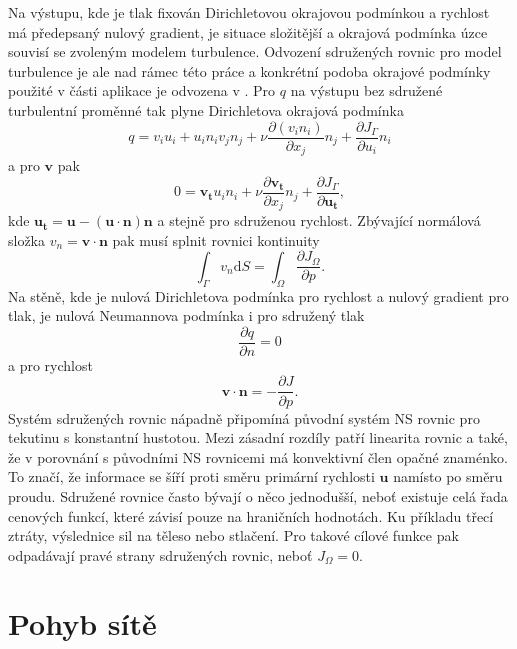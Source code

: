 Na výstupu, kde je tlak fixován Dirichletovou okrajovou podmínkou a rychlost má předepsaný nulový gradient, je situace složitější a okrajová podmínka úzce souvisí se zvoleným modelem turbulence. Odvození sdružených rovnic pro model turbulence je ale nad rámec této práce a konkrétní podoba okrajové podmínky použité v části aplikace je odvozena v \cite{zymaris2009continuous}. Pro $ q $ na výstupu bez sdružené turbulentní proměnné tak plyne Dirichletova okrajová podmínka
\begin{equation}
q = v_i u_i + u_i n_i v_j n_j + \nu \frac{\partial (v_in_i)}{\partial x_j}n_j+\frac{\partial J_\Gamma}{\partial u_i} n_i
\end{equation}
a pro $ \mathbf{v} $ pak
\begin{equation}
0=\mathbf{v_t}u_in_i+\nu\frac{\partial \mathbf{v_t}}{\partial x_j}n_j + \frac{\partial J_\Gamma}{\partial \mathbf{u_t}},
\end{equation}
kde $ \mathbf{u_t}=\mathbf{u}-(\mathbf{u\cdot n})\mathbf{n} $ a stejně pro sdruženou rychlost. Zbývající normálová složka $ v_n=\mathbf{v}\cdot\mathbf{n} $ pak musí splnit rovnici kontinuity
\begin{equation}
\int_{\Gamma}v_n\mathrm{d}S=\int_{\Omega}\frac{\partial J_\Omega}{\partial p}.
\end{equation}
Na stěně, kde je nulová Dirichletova podmínka pro rychlost a nulový gradient pro tlak, je nulová Neumannova podmínka i pro sdružený tlak
\begin{equation}
\frac{\partial q}{\partial n}=0
\end{equation} 
a pro rychlost
\begin{equation}
\mathbf{v} \cdot \mathbf{n}=-\dfrac{\partial J}{\partial p}.
\end{equation}
Systém sdružených rovnic nápadně připomíná původní systém NS rovnic pro tekutinu s konstantní hustotou. Mezi zásadní rozdíly patří linearita rovnic a také, že v porovnání s původními NS rovnicemi má konvektivní člen opačné znaménko. To značí, že informace se šíří proti směru primární rychlosti $ \mathbf{u} $ namísto po směru proudu. Sdružené rovnice často bývají o něco jednodušší, neboť existuje celá řada cenových funkcí, které závisí pouze na hraničních hodnotách. Ku příkladu třecí ztráty, výslednice sil na těleso nebo stlačení. Pro takové cílové funkce pak odpadávají pravé strany sdružených rovnic, neboť $ J_\Omega = 0 $.


\section{Pohyb sítě}

